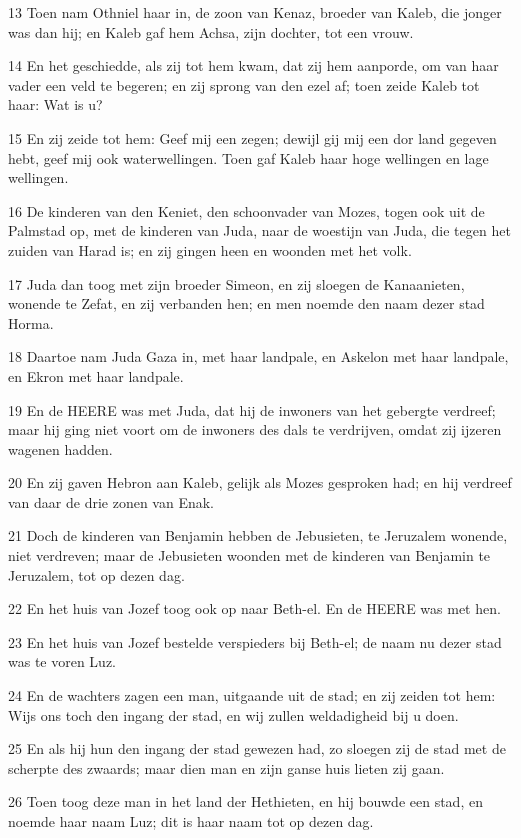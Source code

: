 \par 13 Toen nam Othniel haar in, de zoon van Kenaz, broeder van Kaleb, die jonger was dan hij; en Kaleb gaf hem Achsa, zijn dochter, tot een vrouw.
\par 14 En het geschiedde, als zij tot hem kwam, dat zij hem aanporde, om van haar vader een veld te begeren; en zij sprong van den ezel af; toen zeide Kaleb tot haar: Wat is u?
\par 15 En zij zeide tot hem: Geef mij een zegen; dewijl gij mij een dor land gegeven hebt, geef mij ook waterwellingen. Toen gaf Kaleb haar hoge wellingen en lage wellingen.
\par 16 De kinderen van den Keniet, den schoonvader van Mozes, togen ook uit de Palmstad op, met de kinderen van Juda, naar de woestijn van Juda, die tegen het zuiden van Harad is; en zij gingen heen en woonden met het volk.
\par 17 Juda dan toog met zijn broeder Simeon, en zij sloegen de Kanaanieten, wonende te Zefat, en zij verbanden hen; en men noemde den naam dezer stad Horma.
\par 18 Daartoe nam Juda Gaza in, met haar landpale, en Askelon met haar landpale, en Ekron met haar landpale.
\par 19 En de HEERE was met Juda, dat hij de inwoners van het gebergte verdreef; maar hij ging niet voort om de inwoners des dals te verdrijven, omdat zij ijzeren wagenen hadden.
\par 20 En zij gaven Hebron aan Kaleb, gelijk als Mozes gesproken had; en hij verdreef van daar de drie zonen van Enak.
\par 21 Doch de kinderen van Benjamin hebben de Jebusieten, te Jeruzalem wonende, niet verdreven; maar de Jebusieten woonden met de kinderen van Benjamin te Jeruzalem, tot op dezen dag.
\par 22 En het huis van Jozef toog ook op naar Beth-el. En de HEERE was met hen.
\par 23 En het huis van Jozef bestelde verspieders bij Beth-el; de naam nu dezer stad was te voren Luz.
\par 24 En de wachters zagen een man, uitgaande uit de stad; en zij zeiden tot hem: Wijs ons toch den ingang der stad, en wij zullen weldadigheid bij u doen.
\par 25 En als hij hun den ingang der stad gewezen had, zo sloegen zij de stad met de scherpte des zwaards; maar dien man en zijn ganse huis lieten zij gaan.
\par 26 Toen toog deze man in het land der Hethieten, en hij bouwde een stad, en noemde haar naam Luz; dit is haar naam tot op dezen dag.
